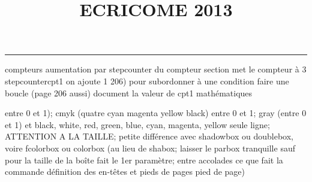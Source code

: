\documentclass[11pt]{article}%
\title{\bf \vspace{-2cm} ECRICOME 2013} %
\author{} %
\date{} %
\renewcommand{\headrulewidth}{0pt}%
\renewcommand{\footrulewidth}{0.4pt}%
\begin{document}
\maketitle %
\vspace{-1.4cm}\hrule %
\thispagestyle{fancy}

\vspace*{.2cm}



compteurs%
aumentation par stepcounter du compteur section%
met le compteur à 3%
stepcounter{cpt1} on ajoute 1%
206) pour subordonner à une condition %
faire une boucle (page 206 aussi) %
document la valeur de cpt1 
mathématiques\newcommand{\ch}{\operatorname{ch}} 
\newcommand{\sh}{\operatorname{sh}}
\renewcommand{\tanh}{\operatorname{th}}
\renewcommand{\sinh}{\operatorname{sh}}
\renewcommand{\cosh}{\operatorname{ch}}
\newcommand{\argsh}{\operatorname{argsh}}
\newcommand{\argch}{\operatorname{argch}}
\newcommand{\argth}{\operatorname{argth}}
\newcommand{\Id}{\operatorname{Id}}
\renewcommand{\leq}{\leq}
\renewcommand{\geq}{\geq }

\newcommand{\dlim}{\lim}
\newcommand{\dsum}{\sum}
\newcommand{\dint}{\int}
\newcommand{\dprod}{\prod}



entre 0 et 1); cmyk (quatre cyan magenta yellow black) entre 0 et 1;
gray (entre 0 et 1) et black, white, red, green, blue, cyan, magenta,
yellow%
seule ligne; ATTENTION A LA TAILLE; petite différence avec shadowbox ou
doublebox, voire fcolorbox ou colorbox (au lieu de shabox; laisser le
parbox tranquille sauf pour la taille de la boîte
\newcommand{\Tbox}[1]{\begin{center} \shabox{\parbox{0.6
\linewidth}{#1}} \end{center}} %
fait le 1er paramètre; entre accolades ce que fait la commande
définition des en-têtes et pieds de pages\pagestyle{fancy}
\chead{}
\rfoot[ \ \thepage]{\thepage}
\cfoot{}
\lfoot{}
\thispagestyle{fancy} %
pied de page)\renewcommand{\footrulewidth}{0.4pt}
\renewcommand{\headrulewidth}{0.4pt}
\end{document}
